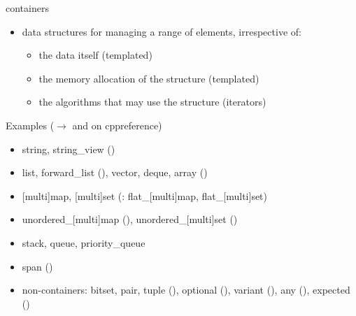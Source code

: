 \begin{frame}[fragile]
  \begin{block}{containers}
    \small
    \begin{itemize}
    \setlength\itemsep{0em}
    \setlength{\parskip}{0pt}
    \setlength{\parsep}{0pt}
    \item data structures for managing a range of elements, irrespective of:
      \begin{itemize}
      \setlength\itemsep{0em}
      \setlength{\parskip}{0pt}
      \setlength{\parsep}{0pt}
      \item the data itself (templated)
      \item the memory allocation of the structure (templated)
      \item the algorithms that may use the structure (iterators)
      \end{itemize}
    \end{itemize}
  \end{block}
  \begin{exampleblock}{Examples ($\rightarrow$ \href{https://en.cppreference.com/w/cpp/string/basic_string}{\color{blue!50!white}{string}} and \href{https://en.cppreference.com/w/cpp/container}{\color{blue!50!white}{container library}} on cppreference)}
    \small
    \begin{itemize}
      \setlength\itemsep{0em}
      \item string, string\_view ()
      \item list, forward\_list (), vector, deque, array ()
      \item {[}multi]map, [multi]set (: flat\_[multi]map, flat\_[multi]set)
      \item unordered\_[multi]map (), unordered\_[multi]set ()
      \item stack, queue, priority\_queue
      \item span ()
      \item non-containers: bitset, pair, tuple (), optional (), variant (), any (), expected ()
    \end{itemize}
  \end{exampleblock}
\end{frame}

